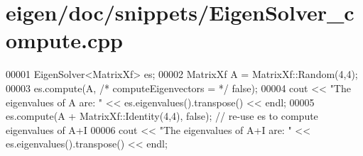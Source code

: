 \hypertarget{eigen_2doc_2snippets_2_eigen_solver__compute_8cpp_source}{}\section{eigen/doc/snippets/\+Eigen\+Solver\+\_\+compute.cpp}
\label{eigen_2doc_2snippets_2_eigen_solver__compute_8cpp_source}

\begin{DoxyCode}
00001 EigenSolver<MatrixXf> es;
00002 MatrixXf A = MatrixXf::Random(4,4);
00003 es.compute(A, \textcolor{comment}{/* computeEigenvectors = */} \textcolor{keyword}{false});
00004 cout << \textcolor{stringliteral}{"The eigenvalues of A are: "} << es.eigenvalues().transpose() << endl;
00005 es.compute(A + MatrixXf::Identity(4,4), \textcolor{keyword}{false}); \textcolor{comment}{// re-use es to compute eigenvalues of A+I}
00006 cout << \textcolor{stringliteral}{"The eigenvalues of A+I are: "} << es.eigenvalues().transpose() << endl;
\end{DoxyCode}
